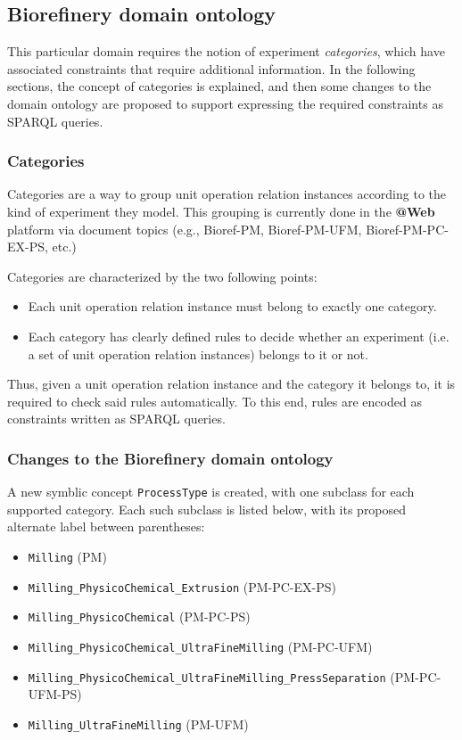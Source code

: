 \documentclass[a4paper, 10pt]{article}
\makeatletter
\newcommand{\atweb}{\textbf{@Web}\xspace}
\newcommand{\code}[1]{\texttt{#1}}
\makeatother
\begin{document}
\subsection{Biorefinery domain ontology}

This particular domain requires the notion of experiment \textit{categories},
which have associated constraints that require additional information. In the
following sections, the concept of categories is explained, and then some
changes to the domain ontology are proposed to support expressing the required
constraints as SPARQL queries.

\subsubsection{Categories}

Categories are a way to group unit operation relation instances according to
the kind of experiment they model. This grouping is currently done in the
\atweb platform via document topics (e.g., Bioref-PM, Bioref-PM-UFM,
Bioref-PM-PC-EX-PS, etc.)

Categories are characterized by the two following points:

\begin{itemize}
  \item Each unit operation relation instance must belong to exactly one
    category.

  \item Each category has clearly defined rules to decide whether an experiment
    (i.e. a set of unit operation relation instances) belongs to it or not.
\end{itemize}

Thus, given a unit operation relation instance and the category it belongs to,
it is required to check said rules automatically. To this end, rules are
encoded as constraints written as SPARQL queries.

\subsubsection{Changes to the Biorefinery domain ontology}

A new symblic concept \code{ProcessType} is created, with one subclass for each
supported category. Each such subclass is listed below, with its proposed
alternate label between parentheses:

\begin{itemize}
  \item \code{Milling} (PM)
  \item \code{Milling\_PhysicoChemical\_Extrusion} (PM-PC-EX-PS)
  \item \code{Milling\_PhysicoChemical} (PM-PC-PS)
  \item \code{Milling\_PhysicoChemical\_UltraFineMilling} (PM-PC-UFM)
  \item \code{Milling\_PhysicoChemical\_UltraFineMilling\_PressSeparation}
  (PM-PC-UFM-PS)
  \item \code{Milling\_UltraFineMilling} (PM-UFM)
\end{itemize}
\end{document}
